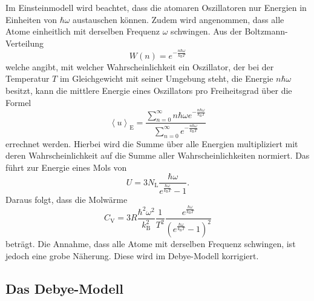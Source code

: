 Im Einsteinmodell wird beachtet, dass die atomaren Oszillatoren nur Energien in Einheiten von $\hbar\omega$ austauschen können.
Zudem wird angenommen, dass alle Atome einheitlich mit derselben Frequenz $\omega$ schwingen.
Aus der Boltzmann-Verteilung
\begin{equation}
  W(n) = e^{-\frac{n\hbar\omega}{k_{\text{B}}T}}
\end{equation}
welche angibt, mit welcher Wahrscheinlichkeit ein Oszillator, der bei der Temperatur $T$ im Gleichgewicht mit seiner Umgebung steht, die Energie $n\hbar\omega$ besitzt, kann die mittlere Energie eines Oszillators pro Freiheitsgrad über die Formel
\begin{equation}
  \left\langle u \right\rangle_{\text{E}} = \frac{\sum_{n=0}^{\infty}n\hbar\omega e^{-\frac{n\hbar\omega}{k_{\text{B}}T}}}{\sum_{n=0}^{\infty} e^{-\frac{n\hbar\omega}{k_{\text{B}}T}}}
\end{equation}
errechnet werden.
Hierbei wird die Summe über alle Energien multipliziert mit deren Wahrscheinlichkeit auf die Summe aller Wahrscheinlichkeiten normiert.
Das führt zur Energie eines Mols von
\begin{equation}
  U = 3N_{\text{L}}\frac{\hbar\omega}{e^{\frac{\hbar\omega}{k_{\text{B}}T}}-1}.
\end{equation}
Daraus folgt, dass die Molwärme
\begin{equation}
  C_{\text{V}} = 3R\frac{\hbar^2\omega^2}{k_{\text{B}}^2}\frac{1}{T^2}\frac{e^{\frac{\hbar\omega}{k_{\text{B}}T}}}{\left(e^{\frac{\hbar\omega}{k_{\text{B}}T}}-1\right)^2}
\end{equation}
beträgt.
Die Annahme, dass alle Atome mit derselben Frequenz schwingen, ist jedoch eine grobe Näherung. Diese wird im Debye-Modell korrigiert.

\subsection{Das Debye-Modell}

